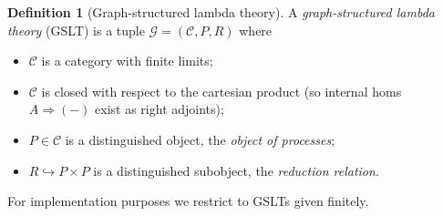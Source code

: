 \documentclass[11pt]{article}
\theoremstyle{plain}
\theoremstyle{definition}
\newtheorem{definition}[theorem]{Definition}
\theoremstyle{remark}
\begin{document}
\begin{definition}[Graph-structured lambda theory]\label{def:gslt}
A \emph{graph-structured lambda theory} (GSLT) is a tuple
$\mathcal{G} = (\mathcal{C}, P, R)$ where
\begin{itemize}[leftmargin=*]
  \item $\mathcal{C}$ is a category with finite limits;
  \item $\mathcal{C}$ is closed with respect to the cartesian product
        (so internal homs $A \Rightarrow ({-})$ exist as right adjoints);
  \item $P \in \mathcal{C}$ is a distinguished object, the
        \emph{object of processes};
  \item $R \hookrightarrow P \times P$ is a distinguished subobject,
        the \emph{reduction relation}.
\end{itemize}
\end{definition}

For implementation purposes we restrict to GSLTs given finitely.
\end{document}
